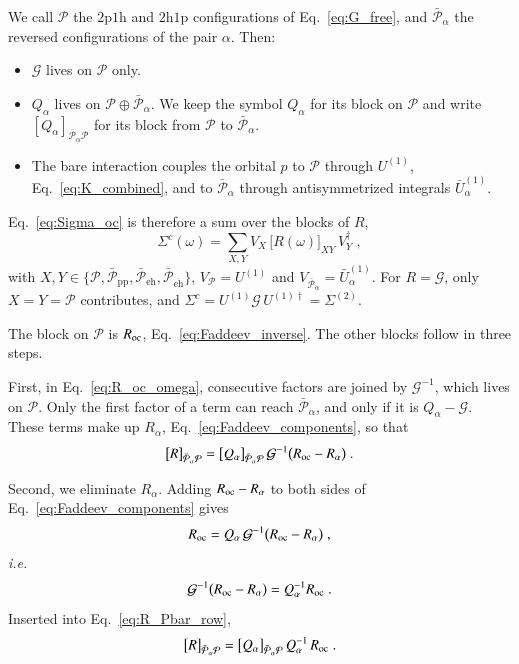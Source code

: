 \documentclass[aip,jcp,reprint,noshowkeys,superscriptaddress]{revtex4-1}
\newcommand{\ie}{\textit{i.e.}}
\newcommand{\hhp}{\text{2h1p}}
\newcommand{\pph}{\text{2p1h}}
\newcommand{\eh}{\text{eh}}
\newcommand{\teh}{\overline{\text{eh}}}
\newcommand{\pp}{\text{pp}}
\begin{document}
We call $\mathcal P$ the $\pph$ and $\hhp$ configurations of
Eq.~\eqref{eq:G_free}, and $\bar{\mathcal P}_\alpha$ the reversed
configurations of the pair $\alpha$. Then:
\begin{itemize}
\item $\mathcal G$ lives on $\mathcal P$ only.
\item $Q_\alpha$ lives on $\mathcal P\oplus\bar{\mathcal P}_\alpha$. We
keep the symbol $Q_\alpha$ for its block on $\mathcal P$ and write
$[Q_\alpha]_{\bar{\mathcal P}_\alpha\mathcal P}$ for its block from
$\mathcal P$ to $\bar{\mathcal P}_\alpha$.
\item The bare interaction couples the orbital $p$ to $\mathcal P$
through $U^{(1)}$, Eq.~\eqref{eq:K_combined}, and to
$\bar{\mathcal P}_\alpha$ through antisymmetrized integrals
$\bar U^{(1)}_\alpha$.
\end{itemize}
Eq.~\eqref{eq:Sigma_oc} is therefore a sum over the blocks of $R$,
\begin{equation}
\Sigma^{c}(\omega)
=
\sum_{X,Y}
V_X\,\big[R(\omega)\big]_{XY}\,V_Y^\dagger \;,
\label{eq:Sigma_full_space}
\end{equation}
with $X,Y\in\{\mathcal P,\bar{\mathcal P}_{\pp},\bar{\mathcal P}_{\eh},\bar{\mathcal P}_{\teh}\}$,
$V_{\mathcal P}=U^{(1)}$ and $V_{\bar{\mathcal P}_\alpha}=\bar U^{(1)}_\alpha$.
For $R=\mathcal G$, only $X=Y=\mathcal P$ contributes, and
$\Sigma^c=U^{(1)}\mathcal G\,U^{(1)\dagger}=\Sigma^{(2)}$.

The block on $\mathcal P$ is $R_{\rm oc}$,
Eq.~\eqref{eq:Faddeev_inverse}. The other blocks follow in three steps.

First, in Eq.~\eqref{eq:R_oc_omega}, consecutive factors are joined by
$\mathcal G^{-1}$, which lives on $\mathcal P$. Only the first factor of
a term can reach $\bar{\mathcal P}_\alpha$, and only if it is
$Q_\alpha-\mathcal G$. These terms make up $R_\alpha$,
Eq.~\eqref{eq:Faddeev_components}, so that
\begin{equation}
\big[R\big]_{\bar{\mathcal P}_\alpha\mathcal P}
=
\big[Q_\alpha\big]_{\bar{\mathcal P}_\alpha\mathcal P}\,
\mathcal G^{-1}\big(R_{\rm oc}-R_\alpha\big) \;.
\label{eq:R_Pbar_row}
\end{equation}

Second, we eliminate $R_\alpha$. Adding $R_{\rm oc}-R_\alpha$ to both
sides of Eq.~\eqref{eq:Faddeev_components} gives
\begin{equation}
R_{\rm oc}
=
Q_\alpha\,\mathcal G^{-1}\big(R_{\rm oc}-R_\alpha\big) \;,
\nonumber
\end{equation}
\ie\
\begin{equation}
\mathcal G^{-1}\big(R_{\rm oc}-R_\alpha\big)
=
Q_\alpha^{-1}R_{\rm oc} \;.
\nonumber
\end{equation}
Inserted into Eq.~\eqref{eq:R_Pbar_row},
\begin{equation}
\big[R\big]_{\bar{\mathcal P}_\alpha\mathcal P}
=
\big[Q_\alpha\big]_{\bar{\mathcal P}_\alpha\mathcal P}\,
Q_\alpha^{-1}\,R_{\rm oc} \;.
\nonumber
\end{equation}
\end{document}
